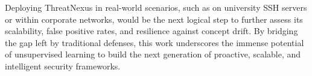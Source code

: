 \documentclass[conference]{IEEEtran}
\begin{document}
Deploying ThreatNexus in real-world scenarios, such as on university SSH servers or within corporate networks, would be the next logical step to further assess its scalability, false positive rates, and resilience against concept drift. By bridging the gap left by traditional defenses, this work underscores the immense potential of unsupervised learning to build the next generation of proactive, scalable, and intelligent security frameworks.




\end{document}
